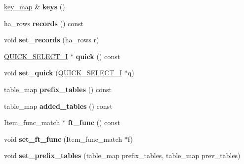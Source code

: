 \begin{DoxyCompactItemize}
\item 
\mbox{\label{classQEP__shared__owner_a3b23ae2e5a8a9c71b764dbe412201d88}} 
\mbox{\hyperlink{classBitmap_3_0164_01_4}{key\+\_\+map}} \& {\bfseries keys} ()
\item 
\mbox{\label{classQEP__shared__owner_a9144caf9a225500edf7b38e5a26c230d}} 
ha\+\_\+rows {\bfseries records} () const
\item 
\mbox{\label{classQEP__shared__owner_a8f87a17e23a56291e5f3634a240a2139}} 
void {\bfseries set\+\_\+records} (ha\+\_\+rows r)
\item 
\mbox{\label{classQEP__shared__owner_a44264019e1f1a0e723f2ab453f3bdaa1}} 
\mbox{\hyperlink{classQUICK__SELECT__I}{Q\+U\+I\+C\+K\+\_\+\+S\+E\+L\+E\+C\+T\+\_\+I}} $\ast$ {\bfseries quick} () const
\item 
\mbox{\label{classQEP__shared__owner_a39cf25aaff4837b3e5ad61ff81b02ec2}} 
void {\bfseries set\+\_\+quick} (\mbox{\hyperlink{classQUICK__SELECT__I}{Q\+U\+I\+C\+K\+\_\+\+S\+E\+L\+E\+C\+T\+\_\+I}} $\ast$q)
\item 
\mbox{\label{classQEP__shared__owner_a94870604ec60fafa01bda64c7809eac6}} 
table\+\_\+map {\bfseries prefix\+\_\+tables} () const
\item 
\mbox{\label{classQEP__shared__owner_afa92ab6d81c3e379addfbec002d77c74}} 
table\+\_\+map {\bfseries added\+\_\+tables} () const
\item 
\mbox{\label{classQEP__shared__owner_a715b63adbf1f03a7bd7af779aaa45c0b}} 
Item\+\_\+func\+\_\+match $\ast$ {\bfseries ft\+\_\+func} () const
\item 
\mbox{\label{classQEP__shared__owner_a81e1143a3792e986f1bf424a4aeb797d}} 
void {\bfseries set\+\_\+ft\+\_\+func} (Item\+\_\+func\+\_\+match $\ast$f)
\item 
\mbox{\label{classQEP__shared__owner_a0b87323e200345c1e8279e7e07cedb9e}} 
void {\bfseries set\+\_\+prefix\+\_\+tables} (table\+\_\+map prefix\+\_\+tables, table\+\_\+map prev\+\_\+tables)

\end{DoxyCompactItemize}
